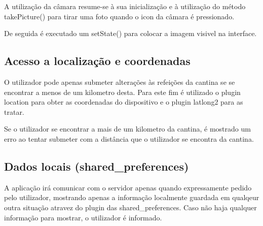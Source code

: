 \documentclass[10pt]{article}
\begin{document}
        A utilização da câmara resume-se à sua inicialização e à utilização do método takePicture() para tirar uma foto quando o icon da câmara é pressionado.

        De seguida é executado um setState() para colocar a imagem visivel na interface.
        
        \subsection{Acesso a localização e coordenadas}

        O utilizador pode apenas submeter alterações às refeições da cantina se se encontrar a menos de um kilometro desta. Para este fim é utilizado o plugin location para obter as coordenadas do dispositivo e o plugin latlong2 para as tratar. 

        Se o utilizador se encontrar a mais de um kilometro da cantina, é mostrado um erro ao tentar submeter com a distância que o utilizador se encontra da cantina.

        \pagebreak

        \subsection{Dados locais (shared\_preferences)}\label{shared_preferences} 
        

		A aplicação irá comunicar com o servidor apenas quando expressamente pedido pelo utilizador, mostrando apenas a informação localmente guardada em qualqeur outra situação atravez do plugin das shared\_preferences.
        Caso não haja qualquer informação para mostrar, o utilizador é informado.
\end{document}
